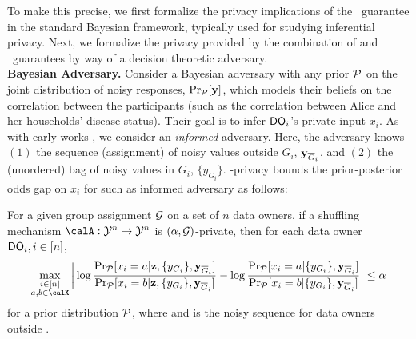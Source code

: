 To make this precise, we first formalize the privacy implications of the \name~guarantee in the standard Bayesian framework, typically used for studying inferential privacy. Next, we formalize the privacy provided by the combination of \ldp and \name~guarantees by way of a decision theoretic adversary. %
\\\textbf{Bayesian Adversary.} Consider a Bayesian adversary with any prior $\mathcal{P}$ on the joint distribution of noisy responses, $\Pr_{\mathcal{P}}[\mathbf{y}]$, which models their beliefs on the correlation between the participants (such as the correlation between Alice and her households' disease status). Their goal is to infer $\textsf{DO}_i$'s private input $x_i$. As with early \DP works \citep{dwork_early}, we consider an \emph{informed} adversary. Here, the adversary %
 knows %
 $(1)$ the sequence (assignment) of noisy values outside $G_i$, $\mathbf{y}_{\overline{G}_i}$, and $(2)$ the (unordered) bag of noisy values in $G_i$, $\{y_{G_i}\}$. \name-privacy bounds the prior-posterior odds gap on $x_i$ for such as informed adversary as follows:  
\begin{thm}
\label{thm: semantic guarantee}
For a given group assignment $\mathcal{G}$ on a set of $n$ data owners, if a shuffling mechanism $\calA:\calY^n\mapsto \calY^n$ is $(\alpha,\mathcal{G})$-\name private, then for each data owner $\textsf{DO}_i, i \in [n]$, %
\begin{align*}
   \max_{\substack{i\in [n]\\ a,b \in \calX}} \bigg|\log \frac{\Pr_\calP [x_i = a | \bz, \{y_{G_i}\},\by_{\overline{G}_i}]}{\Pr_\calP [x_i = b | \bz, \{y_{G_i}\},\by_{\overline{G}_i}]} - \log \frac{\Pr_\calP [x_i = a | \{y_{G_i}\},\by_{\overline{G}_i}]}{\Pr_\calP [x_i = b | \{y_{G_i}\},\by_{\overline{G}_i}]} \bigg| \leq \alpha  %
\end{align*}
for a prior distribution $\mathcal{P}$, where \scalebox{0.9}{$\bz=\calA(\by)$} and  is the noisy sequence for data owners outside \scalebox{0.9}{$G_i$}. %
\end{thm}
